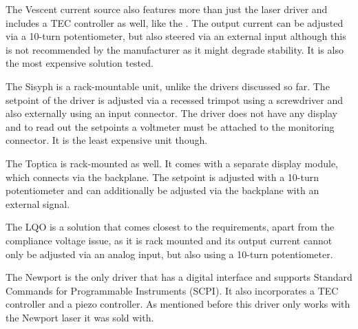The Vescent  current source also features more than just the laser driver and includes a TEC controller as well, like the . The output current can be adjusted via a 10-turn potentiometer, but also steered via an external input although this is not recommended by the manufacturer as it might degrade stability. It is also the most expensive solution tested.

The Sisyph  is a rack-mountable unit, unlike the drivers discussed so far. The setpoint of the driver is adjusted via a recessed trimpot using a screwdriver and also externally using an input connector. The driver does not have any display and to read out the setpoints a voltmeter must be attached to the monitoring connector. It is the least expensive unit though.

The Toptica  is rack-mounted as well. It comes with a separate display module, which connects via the backplane. The setpoint is adjusted with a 10-turn potentiometer and can additionally be adjusted via the backplane with an external signal.

The LQO  is a solution that comes closest to the requirements, apart from the compliance voltage issue, as it is rack mounted and its output current cannot only be adjusted via an analog input, but also using a 10-turn potentiometer.

The Newport  is the only driver that has a digital interface and supports Standard Commands for Programmable Instruments (SCPI). It also incorporates a TEC controller and a piezo controller. As mentioned before this driver only works with the Newport  laser it was sold with.

